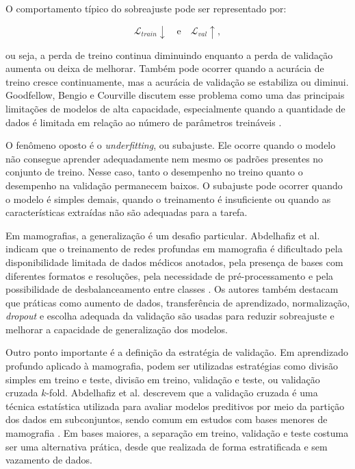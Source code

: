 \documentclass[
    12pt,
    openright,
    oneside,
    a4paper,
    english,
    brazil
]{abntex2}
\begin{document}
O comportamento típico do sobreajuste pode ser representado por:

\[
\mathcal{L}_{train} \downarrow
\quad \text{e} \quad
\mathcal{L}_{val} \uparrow,
\]

ou seja, a perda de treino continua diminuindo enquanto a perda de validação aumenta ou deixa de melhorar. Também pode ocorrer quando a acurácia de treino cresce continuamente, mas a acurácia de validação se estabiliza ou diminui. Goodfellow, Bengio e Courville discutem esse problema como uma das principais limitações de modelos de alta capacidade, especialmente quando a quantidade de dados é limitada em relação ao número de parâmetros treináveis \cite{goodfellow2016deep}.

O fenômeno oposto é o \textit{underfitting}, ou subajuste. Ele ocorre quando o modelo não consegue aprender adequadamente nem mesmo os padrões presentes no conjunto de treino. Nesse caso, tanto o desempenho no treino quanto o desempenho na validação permanecem baixos. O subajuste pode ocorrer quando o modelo é simples demais, quando o treinamento é insuficiente ou quando as características extraídas não são adequadas para a tarefa.

Em mamografias, a generalização é um desafio particular. Abdelhafiz et al. indicam que o treinamento de redes profundas em mamografia é dificultado pela disponibilidade limitada de dados médicos anotados, pela presença de bases com diferentes formatos e resoluções, pela necessidade de pré-processamento e pela possibilidade de desbalanceamento entre classes \cite{abdelhafiz2019}. Os autores também destacam que práticas como aumento de dados, transferência de aprendizado, normalização, \textit{dropout} e escolha adequada da validação são usadas para reduzir sobreajuste e melhorar a capacidade de generalização dos modelos.

Outro ponto importante é a definição da estratégia de validação. Em aprendizado profundo aplicado à mamografia, podem ser utilizadas estratégias como divisão simples em treino e teste, divisão em treino, validação e teste, ou validação cruzada \(k\)-fold. Abdelhafiz et al. descrevem que a validação cruzada é uma técnica estatística utilizada para avaliar modelos preditivos por meio da partição dos dados em subconjuntos, sendo comum em estudos com bases menores de mamografia \cite{abdelhafiz2019}. Em bases maiores, a separação em treino, validação e teste costuma ser uma alternativa prática, desde que realizada de forma estratificada e sem vazamento de dados.
\end{document}

